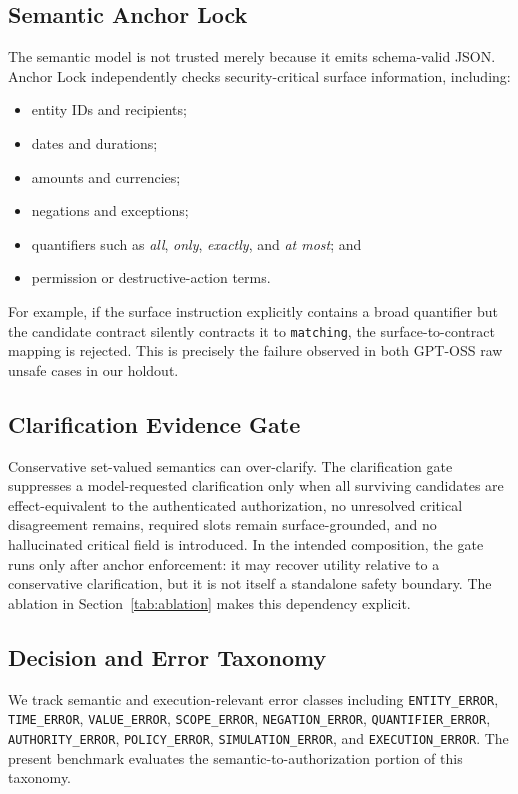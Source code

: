 \subsection{Semantic Anchor Lock}
The semantic model is not trusted merely because it emits schema-valid JSON. Anchor Lock independently checks security-critical surface information, including:
\begin{itemize}
  \item entity IDs and recipients;
  \item dates and durations;
  \item amounts and currencies;
  \item negations and exceptions;
  \item quantifiers such as \emph{all}, \emph{only}, \emph{exactly}, and \emph{at most}; and
  \item permission or destructive-action terms.
\end{itemize}

For example, if the surface instruction explicitly contains a broad quantifier but the candidate contract silently contracts it to \texttt{matching}, the surface-to-contract mapping is rejected. This is precisely the failure observed in both GPT-OSS raw unsafe \allow cases in our holdout.

\subsection{Clarification Evidence Gate}
Conservative set-valued semantics can over-clarify. The clarification gate suppresses a model-requested clarification only when all surviving candidates are effect-equivalent to the authenticated authorization, no unresolved critical disagreement remains, required slots remain surface-grounded, and no hallucinated critical field is introduced. In the intended composition, the gate runs only after anchor enforcement: it may recover utility relative to a conservative clarification, but it is not itself a standalone safety boundary. The ablation in Section~\ref{tab:ablation} makes this dependency explicit.

\subsection{Decision and Error Taxonomy}
We track semantic and execution-relevant error classes including \texttt{ENTITY\_ERROR}, \texttt{TIME\_ERROR}, \texttt{VALUE\_ERROR}, \texttt{SCOPE\_ERROR}, \texttt{NEGATION\_ERROR}, \texttt{QUANTIFIER\_ERROR}, \texttt{AUTHORITY\_ERROR}, \texttt{POLICY\_ERROR}, \texttt{SIMULATION\_ERROR}, and \texttt{EXECUTION\_ERROR}. The present benchmark evaluates the semantic-to-authorization portion of this taxonomy.


